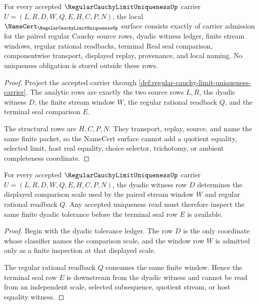 \begin{theorem}
\label{thm:regular-cauchy-limit-uniqueness-namecert-obligations}
For every accepted $\RegularCauchyLimitUniquenessUp$ carrier $U=(L,R,D,W,Q,E,H,C,P,N)$, the local $\NameCert_{\RegularCauchyLimitUniquenessUp}$ surface consists exactly of carrier admission for the paired regular Cauchy source rows, dyadic witness ledger, finite stream windows, regular rational readbacks, terminal Real seal comparison, componentwise transport, displayed replay, provenance, and local naming. No uniqueness obligation is stored outside these rows.
\end{theorem}
\begin{proof}
Project the accepted carrier through \autoref{def:regular-cauchy-limit-uniqueness-carrier}. The analytic rows are exactly the two source rows $L,R$, the dyadic witness $D$, the finite stream window $W$, the regular rational readback $Q$, and the terminal seal comparison $E$.

The structural rows are $H,C,P,N$. They transport, replay, source, and name the same finite packet, so the NameCert surface cannot add a quotient equality, selected limit, host real equality, choice selector, trichotomy, or ambient completeness coordinate.
\end{proof}

\begin{theorem}
\label{thm:regular-cauchy-limit-uniqueness-dyadic-witness-determinacy}
For every accepted $\RegularCauchyLimitUniquenessUp$ carrier $U=(L,R,D,W,Q,E,H,C,P,N)$, the dyadic witness row $D$ determines the displayed comparison scale used by the paired stream window $W$ and regular rational readback $Q$. Any accepted uniqueness read must therefore inspect the same finite dyadic tolerance before the terminal seal row $E$ is available.
\end{theorem}
\begin{proof}
Begin with the dyadic tolerance ledger. The row $D$ is the only coordinate whose classifier names the comparison scale, and the window row $W$ is admitted only as a finite inspection at that displayed scale.

The regular rational readback $Q$ consumes the same finite window. Hence the terminal seal row $E$ is downstream from the dyadic witness and cannot be read from an independent scale, selected subsequence, quotient stream, or host equality witness.
\end{proof}

